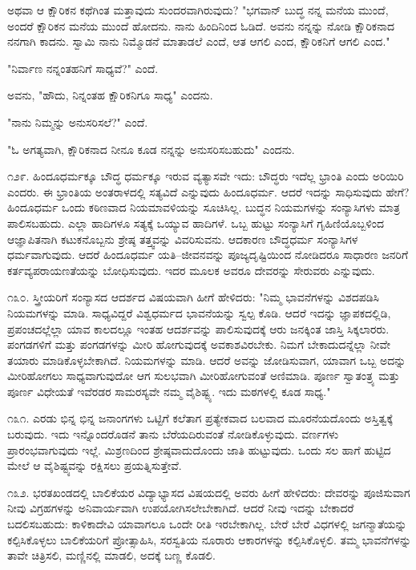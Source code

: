 ಅಥವಾ ಆ ಕ್ಷೌರಿಕನ ಕಥೆಗಿಂತ ಮತ್ತಾವುದು ಸುಂದರವಾಗಿರುವುದು? "ಭಗವಾನ್ ಬುದ್ಧ ನನ್ನ ಮನೆಯ ಮುಂದೆ, ಅಂದರೆ ಕ್ಷೌರಿಕನ ಮನೆಯ ಮುಂದೆ ಹೋದನು. ನಾನು ಹಿಂದಿನಿಂದ ಓಡಿದೆ. ಅವನು ನನ್ನನ್ನು ನೋಡಿ ಕ್ಷೌರಿಕನಾದ ನನಗಾಗಿ ಕಾದನು. ಸ್ವಾಮಿ ನಾನು ನಿಮ್ಮೊಡನೆ ಮಾತಾಡಲೆ ಎಂದೆ, ಆತ ಆಗಲಿ ಎಂದ, ಕ್ಷೌರಿಕನಿಗೆ ಆಗಲಿ ಎಂದ."

"ನಿರ್ವಾಣ ನನ್ನಂತಹನಿಗೆ ಸಾಧ್ಯವೆ?" ಎಂದೆ.

ಅವನು, "ಹೌದು, ನಿನ್ನಂತಹ ಕ್ಷೌರಿಕನಿಗೂ ಸಾಧ್ಯ" ಎಂದನು.

"ನಾನು ನಿಮ್ಮನ್ನು ಅನುಸರಿಸಲೆ?" ಎಂದೆ.

"ಓ ಅಗತ್ಯವಾಗಿ, ಕ್ಷೌರಿಕನಾದ ನೀನೂ ಕೂಡ ನನ್ನನ್ನು ಅನುಸರಿಸಬಹುದು" ಎಂದನು.

೧೨೯. ಹಿಂದೂಧರ್ಮಕ್ಕೂ ಬೌದ್ಧ ಧರ್ಮಕ್ಕೂ ಇರುವ ವ್ಯತ್ಯಾಸವೇ ಇದು: ಬೌದ್ಧರು ಇದೆಲ್ಲ ಭ್ರಾಂತಿ ಎಂದು ಅರಿಯಿರಿ ಎಂದರು. ಈ ಭ್ರಾಂತಿಯ ಅಂತರಾಳದಲ್ಲಿ ಸತ್ಯವಿದೆ ಎನ್ನುವುದು ಹಿಂದೂಧರ್ಮ. ಆದರೆ ಇದನ್ನು ಸಾಧಿಸುವುದು ಹೇಗೆ? ಹಿಂದೂಧರ್ಮ ಒಂದು ಕಠಿಣವಾದ ನಿಯಮಾವಳಿಯನ್ನು ಸೂಚಿಸಿಲ್ಲ. ಬುದ್ಧನ ನಿಯಮಗಳನ್ನು ಸಂನ್ಯಾಸಿಗಳು ಮಾತ್ರ ಪಾಲಿಸಬಹುದು. ಎಲ್ಲಾ ಹಾದಿಗಳೂ ಸತ್ಯಕ್ಕೆ ಒಯ್ಯುವ ಹಾದಿಗಳೆ. ಒಬ್ಬ ಹುಟ್ಟು ಸಂನ್ಯಾಸಿಗೆ ಗೃಹಿಣಿಯೊಬ್ಬಳಿಂದ ಆಜ್ಞಾಪಿತನಾಗಿ ಕಟುಕನೊಬ್ಬನು ಶ್ರೇಷ್ಠ ತತ್ತ್ವವನ್ನು ವಿವರಿಸುವನು. ಆದಕಾರಣ ಬೌದ್ಧಧರ್ಮ ಸಂನ್ಯಾಸಿಗಳ ಧರ್ಮವಾಗುವುದು. ಆದರೆ ಹಿಂದೂಧರ್ಮ ಯತಿ–ಜೀವನವನ್ನು ಪೂಜ್ಯದೃಷ್ಟಿಯಿಂದ ನೋಡಿದರೂ ಸಾಧಾರಣ ಜನರಿಗೆ ಕರ್ತವ್ಯಪರಾಯಣತೆಯನ್ನು ಬೋಧಿಸುವುದು. ಇದರ ಮೂಲಕ ಅವರೂ ದೇವರನ್ನು ಸೇರುವರು ಎನ್ನುವುದು.

೧೩೦. ಸ್ತ್ರೀಯರಿಗೆ ಸಂನ್ಯಾಸದ ಆದರ್ಶದ ವಿಷಯವಾಗಿ ಹೀಗೆ ಹೇಳಿದರು: "ನಿಮ್ಮ ಭಾವನೆಗಳನ್ನು ವಿಶದಪಡಿಸಿ ನಿಯಮಗಳನ್ನು ಮಾಡಿ. ಸಾಧ್ಯವಿದ್ದರೆ ವಿಶ್ವಧರ್ಮದ ಭಾವನೆಯನ್ನು ಸ್ವಲ್ಪ ಕೊಡಿ. ಆದರೆ ಇದನ್ನು ಜ್ಞಾಪಕದಲ್ಲಿಡಿ, ಪ್ರಪಂಚದಲ್ಲೆಲ್ಲಾ ಯಾವ ಕಾಲದಲ್ಲೂ ಇಂತಹ ಆದರ್ಶವನ್ನು ಪಾಲಿಸುವುದಕ್ಕೆ ಆರು ಜನಕ್ಕಿಂತ ಜಾಸ್ತಿ ಸಿಕ್ಕಲಾರರು. ಪಂಗಡಗಳಿಗೆ ಮತ್ತು ಪಂಗಡಗಳನ್ನು ಮೀರಿ ಹೋಗುವುದಕ್ಕೆ ಅವಕಾಶವಿರಬೇಕು. ನಿಮಗೆ ಬೇಕಾದುದನ್ನೆಲ್ಲಾ ನೀವೇ ತಯಾರು ಮಾಡಿಕೊಳ್ಳಬೇಕಾಗಿದೆ. ನಿಯಮಗಳನ್ನು ಮಾಡಿ. ಆದರೆ ಅವನ್ನು ಜೋಡಿಸುವಾಗ, ಯಾವಾಗ ಒಬ್ಬ ಅದನ್ನು ಮೀರಿಹೋಗಲು ಸಾಧ್ಯವಾಗುವುದೋ ಆಗ ಸುಲಭವಾಗಿ ಮೀರಿಹೋಗುವಂತೆ ಅಣಿಮಾಡಿ. ಪೂರ್ಣ ಸ್ವಾತಂತ್ರ್ಯ ಮತ್ತು ಪೂರ್ಣ ವಿಧೇಯತೆ ಇವೆರಡರ ಸಾಮರಸ್ಯವೇ ನಮ್ಮ ವೈಶಿಷ್ಟ್ಯ. ಇದು ಮಠಗಳಲ್ಲಿ ಕೂಡ ಸಾಧ್ಯ."

೧೩೧. ಎರಡು ಭಿನ್ನ ಭಿನ್ನ ಜನಾಂಗಗಳು ಒಟ್ಟಿಗೆ ಕಲೆತಾಗ ಪ್ರತ್ಯೇಕವಾದ ಬಲವಾದ ಮೂರನೆಯದೊಂದು ಅಸ್ತಿತ್ವಕ್ಕೆ ಬರುವುದು. ಇದು ಇನ್ನೊಂದರೊಡನೆ ತಾನು ಬೆರೆಯದಿರುವಂತೆ ನೋಡಿಕೊಳ್ಳುವುದು. ವರ್ಣಗಳು ಪ್ರಾರಂಭವಾಗುವುದು ಇಲ್ಲೆ. ಮಿಶ್ರಣದಿಂದ ಶ್ರೇಷ್ಠವಾದುದೊಂದು ಜಾತಿ ಹುಟ್ಟುವುದು. ಒಂದು ಸಲ ಹಾಗೆ ಹುಟ್ಟಿದ ಮೇಲೆ ಆ ವೈಶಿಷ್ಟ್ಯವನ್ನು ರಕ್ಷಿಸಲು ಪ್ರಯತ್ನಿಸುತ್ತೇವೆ.

೧೩೨. ಭರತಖಂಡದಲ್ಲಿ ಬಾಲಿಕೆಯರ ವಿದ್ಯಾಭ್ಯಾಸದ ವಿಷಯದಲ್ಲಿ ಅವರು ಹೀಗೆ ಹೇಳಿದರು: ದೇವರನ್ನು ಪೂಜಿಸುವಾಗ ನೀವು ವಿಗ್ರಹಗಳನ್ನು ಅನಿವಾರ್ಯವಾಗಿ ಉಪಯೋಗಿಸಲೇಬೇಕಾಗಿದೆ. ಆದರೆ ನೀವು ಇದನ್ನು ಬೇಕಾದರೆ ಬದಲಿಸಬಹುದು: ಕಾಳಿಕಾದೇವಿ ಯಾವಾಗಲೂ ಒಂದೇ ರೀತಿ ಇರಬೇಕಾಗಿಲ್ಲ. ಬೇರೆ ಬೇರೆ ವಿಧಗಳಲ್ಲಿ ಜಗನ್ಮಾತೆಯನ್ನು ಕಲ್ಪಿಸಿಕೊಳ್ಳಲು ಬಾಲಿಕೆಯರಿಗೆ ಪ್ರೋತ್ಸಾಹಿಸಿ, ಸರಸ್ವತಿಯ ನೂರಾರು ಆಕಾರಗಳನ್ನು ಕಲ್ಪಿಸಿಕೊಳ್ಳಲಿ. ತಮ್ಮ ಭಾವನೆಗಳನ್ನು ತಾವೇ ಚಿತ್ರಿಸಲಿ, ಮಣ್ಣಿನಲ್ಲಿ ಮಾಡಲಿ, ಅದಕ್ಕೆ ಬಣ್ಣ ಕೊಡಲಿ.

